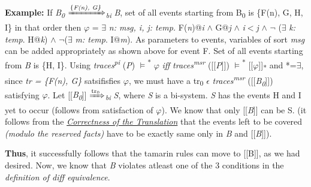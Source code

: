 \documentclass[11pt]{article}
\begin{document}
{\bf Example:} If {\it B\textsubscript{0}} {$\xRightarrow[\text{}]{\text{\{\it {F(n), G\}}}}$}\textsubscript{{\it bi}} {\it B}, set of all events starting from B\textsubscript{0} is \{F(n), G, H, I\} in that order then $\varphi$ = $\exists$ {\it n: msg, i, j: temp.} F({\it n})@{\it i} $\wedge$ G@{\it j} $\wedge$ {\it i$<$j} $\wedge$ $\neg$ ($\exists$ {\it k: temp}. H@{\it k}) $\wedge$ $\neg$($\exists$ {\it m: temp}. I@{\it m}).\newline
\hspace*{14pt}{\it Note:} As parameters to events, variables of sort {\it msg} can be added appropriately as shown above for event F.\newline\newline
Set of all events starting from {\it B} is \{H, I\}. Using {\it traces\textsuperscript{pi}} ({\it P}) $\models$\textsuperscript{*} $\varphi$ {\it iff}  {\it traces\textsuperscript{msr}} ([[{\it P}]]) $\models$\textsuperscript{*} [[$\varphi$]]\textsubscript{*} and *=$\exists$, since {\it tr = \{F(n), G\}} satsifisfies $\varphi$, we must have a tr\textsubscript{0} $\epsilon$ {\it traces\textsuperscript{msr}} ([[{\it B\textsubscript{0}}]]) \\satisfying $\varphi$.\newline 
\hspace*{14pt} Let [[{\it B\textsubscript{0}}]] {$\xRightarrow[\text{}]{\text{tr\textsubscript{0}}}$}\textsubscript{{\it bi}} {\it S}, where {\it S} is a bi-system. {\it S} has the events H and I yet to occur (follows from satisfaction of $\varphi$). We know that only [[{\it B}]] can be S. (it follows from the {\it \underline{Correctness of the Translation}} that the events left to be covered {\it (modulo the reserved facts)} have to be exactly same only in {\it B} and [[{\it B}]]).\newline

\vspace{6pt}
{\bf Thus}, it successfully follows that the tamarin rules can move to [[B]], as we had desired. Now, we know that {\it B} violates atleast one of the 3 conditions in the {\it definition of diff equivalence}. 
\end{document}
